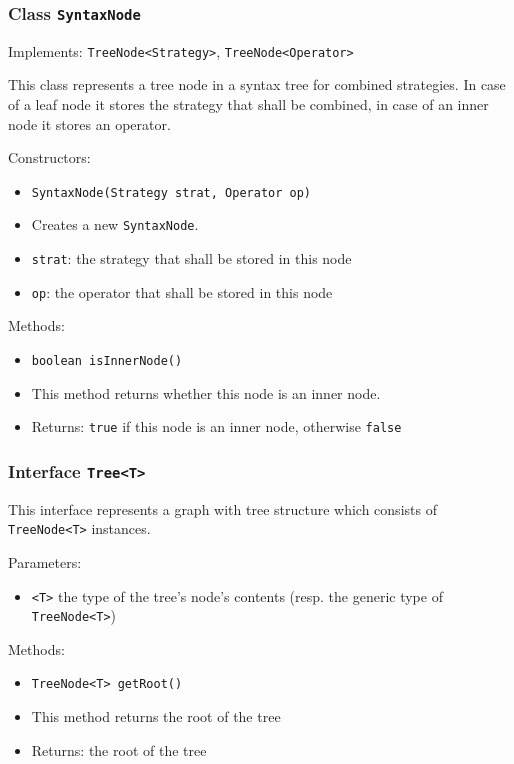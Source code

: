 \documentclass[parskip=full,11pt]{scrartcl}
\begin{document}
\subsubsection{Class \texttt{SyntaxNode}}
Implements: \texttt{TreeNode<Strategy>}, \texttt{TreeNode<Operator>}

This class represents a tree node in a syntax tree for combined strategies. In case of a leaf node it stores the strategy that shall be combined, in case of an inner node it stores an operator.

Constructors:
\begin{itemize} \itemsep -10pt
	\item \texttt{SyntaxNode(Strategy strat, Operator op)}
	\item[] Creates a new \texttt{SyntaxNode}.
	\item[] \texttt{strat}: the strategy that shall be stored in this node
	\item[] \texttt{op}: the operator that shall be stored in this node
\end{itemize}

Methods:
\begin{itemize} \itemsep -10pt
	\item \texttt{boolean isInnerNode()}
	\item[] This method returns whether this node is an inner node.
	\item[] Returns: \texttt{true} if this node is an inner node, otherwise \texttt{false}
\end{itemize}
\newpage
\subsubsection{Interface \texttt{Tree<T>}}

This interface represents a graph with tree structure which consists of \texttt{TreeNode<T>} instances.

Parameters:
\begin{itemize} \itemsep -10pt
	\item \texttt{<T>} the type of the tree's node's contents (resp. the generic type of \texttt{TreeNode<T>})
\end{itemize}

Methods:
\begin{itemize}\itemsep -10pt
	\item \texttt{TreeNode<T> getRoot()}
	\item[] This method returns the root of the tree
	\item[] Returns: the root of the tree
\end{itemize}
\end{document}
